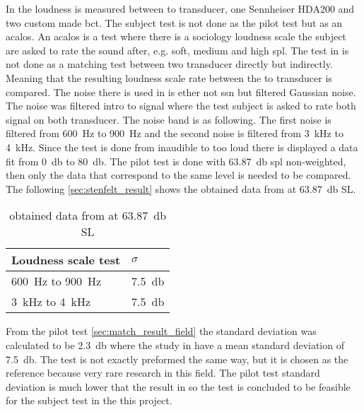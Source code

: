 In \citep{STENFELT201385} the loudness is measured between to transducer, one Sennheiser HDA200 and two custom made \gls{bct}. The subject test is not done as the pilot test but as an \gls{acalos}. An \gls{acalos} is a test where there is a sociology loudness scale the subject are asked to rate the sound after, e.g. soft, medium and high \gls{spl}. The test in \citep{STENFELT201385} is not done as a matching test between two transducer directly but indirectly. Meaning that the resulting loudness scale rate between the to transducer is compared. The noise there is used in \citep{STENFELT201385} is ether not \gls{ssn} but filtered Gaussian noise. The noise was filtered intro to signal where the test subject is asked to rate both signal on both transducer. The noise band is as following. The first noise is filtered from \SI{600}{\hertz} to \SI{900}{\hertz} and the second noise is filtered from \SI{3}{\kilo\hertz} to \SI{4}{\kilo\hertz}. Since the test is done from inaudible to too loud there is displayed a data fit from \SI{0}{\decibel} to \SI{80}{\decibel}. The pilot test is done with \SI{63.87}{\decibel} \gls{spl} non-weighted, then only the data that correspond to the same level is needed to be compared. The following \autoref{sec:stenfelt_result} shows the obtained data from \citep{STENFELT201385} at \SI{63.87}{\decibel} SL.


\begin{table}[H]
\centering
\caption{obtained data from \citep{STENFELT201385} at \SI{63.87}{\decibel} SL}
\begin{tabular}{l|l}
Loudness scale test                        & $\sigma$            \\ \hline
\SI{600}{\hertz} to \SI{900}{\hertz}       & \SI{7.5}{\decibel} \\
\SI{3}{\kilo\hertz} to \SI{4}{\kilo\hertz} & \SI{7.5}{\decibel}
\end{tabular}
\label{sec:stenfelt_result}
\end{table}

From the pilot test \autoref{sec:match_result_field} the standard deviation was calculated to be \SI{2.3}{\decibel} where the study in \citep{STENFELT201385} have a mean standard deviation of \SI{7.5}{\decibel}. The test is not exactly preformed the same way, but it is chosen as the reference because very rare research in this field. The pilot test standard deviation is much lower that the result in \citep{STENFELT201385} so the test is concluded to be feasible for the subject test in the this project.

